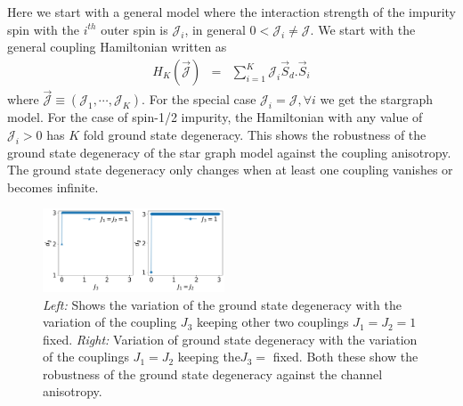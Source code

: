 \documentclass[reprint,prb,superscriptaddress]{revtex4-1}
\begin{document}
Here we start with a general model where the interaction strength of the impurity spin with the $i^{th}$ outer spin is $\mathcal{J}_i$, in general $0<\mathcal{J}_i\neq \mathcal{J}$. We start with the general coupling Hamiltonian written as 
\begin{eqnarray}
H_K (\vec{{\mathcal{J}}}) &=& \sum_{i=1}^{K} {\mathcal{J}}_i\vec{S}_d.\vec{S}_i
\label{eq:anisotropy}
\end{eqnarray}
where $ \vec{{\mathcal{J}}} \equiv ({\mathcal{J}}_1,\cdots,{\mathcal{J}}_K)$. For the special case $\mathcal{J}_i=\mathcal{J}, \forall i$ we get the stargraph model. For the case of spin-1/2 impurity, the Hamiltonian with any value of $\mathcal{J}_i>0$ has $K$ fold ground state degeneracy. This shows the robustness of the ground state degeneracy of the star graph model against the coupling anisotropy. The ground state degeneracy only changes when at least one coupling vanishes or becomes infinite. 
\begin{figure}
\centering
\includegraphics[width=0.48\textwidth]{plt/Anisotropy_Channel_3.png}
\caption{\textit{Left:} Shows the variation of the ground state degeneracy with the variation of the coupling $J_3$ keeping other two couplings $J_1=J_2=1$ fixed. \textit{Right:} Variation of ground state degeneracy with the variation of the couplings $J_1=J_2$ keeping the$J_3=$ fixed. Both these show the robustness of the ground state degeneracy against the channel anisotropy.}
\label{fig:channel-anisotropy-}
\end{figure}
\end{document}
